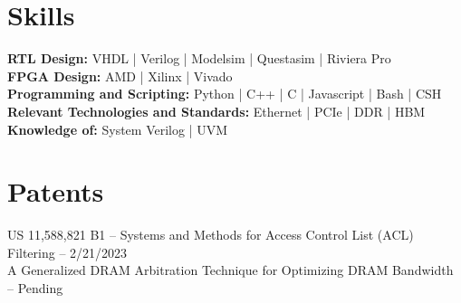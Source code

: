 \documentclass[10pt]{deedy-resume-reversed}
\begin{document}
\begin{minipage}[t]{1.0\textwidth}

\section{Skills}
\textbf{RTL Design:} VHDL | Verilog | Modelsim | Questasim | Riviera Pro \\ 
\textbf{FPGA Design:} AMD | Xilinx | Vivado \\
\textbf{Programming and Scripting:} Python | C++ | C | Javascript | Bash | CSH \\
\textbf{Relevant Technologies and Standards:} Ethernet | PCIe | DDR | HBM \\
\textbf{Knowledge of:} System Verilog | UVM \\
\sectionsep


\section{Patents}
US 11,588,821 B1 – Systems and Methods for Access Control List (ACL) Filtering – 2/21/2023 \\
A Generalized DRAM Arbitration Technique for Optimizing DRAM Bandwidth – Pending
\sectionsep

\end{minipage}
\end{document}
